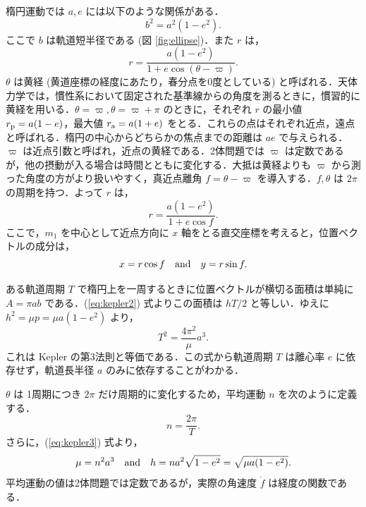 \documentclass[11pt,a4paper,oneside,onecolumn]{jarticle}
\begin{document}
楕円運動では $a, e$ には以下のような関係がある．
\begin{equation}
b^2 = a^2 (1 - e^2).
\end{equation}
ここで $b$ は軌道短半径である (図 \ref{fig:ellipse})．また $r$ は，
\begin{equation}
r =\frac{a (1 - e^2)}{1+ e \cos (\theta - \varpi)}.
\end{equation}
$\theta$ は黄経 (黄道座標の経度にあたり，春分点を0度としている) と呼ばれる．天体力学では，慣性系において固定された基準線からの角度を測るときに，慣習的に黄経を用いる．$\theta = \varpi, \theta = \varpi + \pi$ のときに，それぞれ $r$ の最小値 $r_{\rm p} = a (1 - e)$，最大値 $r_{\rm a} = a (1 + e)$ をとる．これらの点はそれぞれ近点，遠点と呼ばれる．楕円の中心からどちらかの焦点までの距離は $a e$ で与えられる．$\varpi$ は近点引数と呼ばれ，近点の黄経である．2体問題では $\varpi$ は定数であるが，他の摂動が入る場合は時間とともに変化する．大抵は黄経よりも $\varpi$ から測った角度の方がより扱いやすく，真近点離角 $f = \theta - \varpi$ を導入する．$f, \theta$ は $2 \pi$ の周期を持つ．よって $r$ は，
\begin{equation}
r = \frac{a (1 - e^2)}{1+ e \cos f}. \label{eq:rf}
\end{equation}
ここで，$m_1$ を中心として近点方向に $x$ 軸をとる直交座標を考えると，位置ベクトルの成分は，
\begin{equation}
x = r \cos f \quad {\rm and} \quad y = r \sin f. \label{eq:xy}
\end{equation}

ある軌道周期 $T$ で楕円上を一周するときに位置ベクトルが横切る面積は単純に $A = \pi a b$ である．(\ref{eq:kepler2}) 式よりこの面積は $h T / 2$ と等しい．ゆえに $h^2 = \mu p = \mu a (1 - e^2)$ より，
\begin{equation}
T^2 = \frac{4 \pi^2}{\mu} a^3. \label{eq:kepler3}
\end{equation}
これは Kepler の第3法則と等価である．この式から軌道周期 $T$ は離心率 $e$ に依存せず，軌道長半径 $a$ のみに依存することがわかる．

$\theta$ は 1周期につき $2 \pi$ だけ周期的に変化するため，平均運動 $n$ を次のように定義する．
\begin{equation}
n = \frac{2 \pi}{T}. \label{eq:n}
\end{equation}
さらに，(\ref{eq:kepler3}) 式より，
\begin{equation}
\mu = n^2 a^3 \quad {\rm and} \quad h = n a^2 \sqrt{1 - e^2} = \sqrt{\mu a (1 - e^2)}.
\end{equation}
平均運動の値は2体問題では定数であるが，実際の角速度 $\dot{f}$ は経度の関数である．
\end{document}

